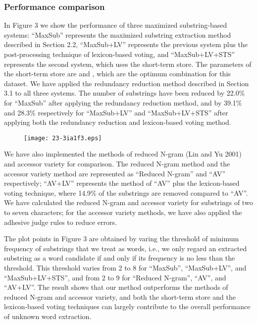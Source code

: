 \documentclass[english]{jnlp_1.4}
\begin{document}
\subsubsection{Performance comparison}

In Figure 3 we show the performance of three maximized substring-based systems: ``MaxSub'' represents the maximized substring extraction method described in Section 2.2, ``MaxSub+LV'' represents the previous system plus the post-processing technique of lexicon-based voting, and ``MaxSub+LV+STS'' represents the second system, which uses the short-term store. The parameters of the short-term store are  and , which are the optimum combination for this dataset. We have applied the redundancy reduction method described in Section 3.1 to all three systems. The number of substrings have been reduced by 22.0\% for ``MaxSub'' after applying the redundancy reduction method, and by 39.1\% and 28.3\% respectively for ``MaxSub+LV'' and ``MaxSub+LV+STS'' after applying both the redundancy reduction and lexicon-based voting method. 

\begin{figure}[b]
\begin{center}
\texttt{[image: 23-3ia1f3.eps]}
\end{center}
\end{figure}

We have also implemented the methods of reduced N-gram (Lin and Yu 2001) and accessor variety \cite{feng2004accessor} for comparison. The reduced N-gram method and the accessor variety method are represented as ``Reduced N-gram'' and ``AV'' respectively; ``AV+LV'' represents the method of ``AV'' plus the lexicon-based voting technique, where 14.9\% of the substrings are removed compared to ``AV''. We have calculated the reduced N-gram and accessor variety for substrings of two to seven characters; for the accessor variety methods, we have also applied the adhesive judge rules \cite{feng2004accessor} to reduce errors.

The plot points in Figure 3 are obtained by varing the threshold of minimum frequency of substrings that we treat as words, i.e., we only regard an extracted substring as a word candidate if and only if its frequency is no less than the threshold. This threshold varies from 2 to 8 for ``MaxSub'', ``MaxSub+LV'', and ``MaxSub+LV+STS'', and from 2 to 9 for ``Reduced N-gram'', ``AV'', and ``AV+LV''. The result shows that our method outperforms the methods of reduced N-gram and accessor variety, and both the short-term store and the lexicon-based voting techniques can largely contribute to the overall performance of unknown word extraction. 
\end{document}
